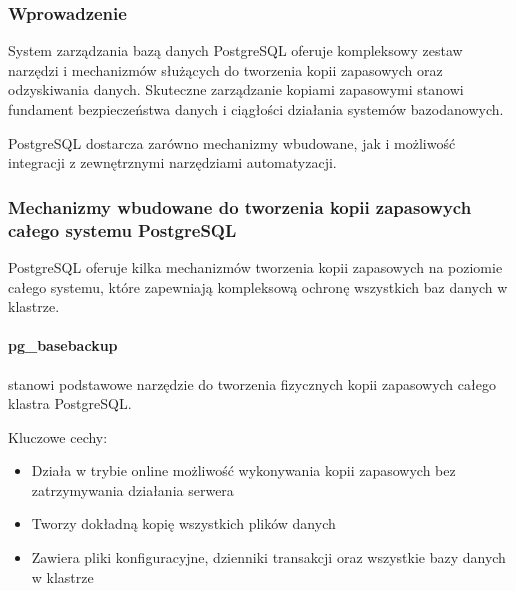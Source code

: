 \documentclass[letterpaper,10pt,polish]{sphinxmanual}
\begin{document}
\subsubsection{Wprowadzenie}
\label{\detokenize{rozdzial2/Kopie_zapasowe_i_odzyskiwanie_danych/kopie_zapasowe_i_odzyskiwanie_danych:wprowadzenie}}
\sphinxAtStartPar
System zarządzania bazą danych PostgreSQL oferuje kompleksowy zestaw narzędzi i mechanizmów służących do tworzenia kopii zapasowych oraz odzyskiwania danych. Skuteczne zarządzanie kopiami zapasowymi stanowi fundament bezpieczeństwa danych i ciągłości działania systemów bazodanowych.

\sphinxAtStartPar
PostgreSQL dostarcza zarówno mechanizmy wbudowane, jak i możliwość integracji z zewnętrznymi narzędziami automatyzacji.


\subsubsection{Mechanizmy wbudowane do tworzenia kopii zapasowych całego systemu PostgreSQL}
\label{\detokenize{rozdzial2/Kopie_zapasowe_i_odzyskiwanie_danych/kopie_zapasowe_i_odzyskiwanie_danych:mechanizmy-wbudowane-do-tworzenia-kopii-zapasowych-calego-systemu-postgresql}}
\sphinxAtStartPar
PostgreSQL oferuje kilka mechanizmów tworzenia kopii zapasowych na poziomie całego systemu, które zapewniają kompleksową ochronę wszystkich baz danych w klastrze.


\paragraph{pg\_basebackup}
\label{\detokenize{rozdzial2/Kopie_zapasowe_i_odzyskiwanie_danych/kopie_zapasowe_i_odzyskiwanie_danych:pg-basebackup}}
\sphinxAtStartPar
{} stanowi podstawowe narzędzie do tworzenia fizycznych kopii zapasowych całego klastra PostgreSQL.

\sphinxAtStartPar
Kluczowe cechy:
\begin{itemize}
\item {} 
\sphinxAtStartPar
Działa w trybie online \sphinxhyphen{} możliwość wykonywania kopii zapasowych bez zatrzymywania działania serwera

\item {} 
\sphinxAtStartPar
Tworzy dokładną kopię wszystkich plików danych

\item {} 
\sphinxAtStartPar
Zawiera pliki konfiguracyjne, dzienniki transakcji oraz wszystkie bazy danych w klastrze

\end{itemize}
\end{document}
